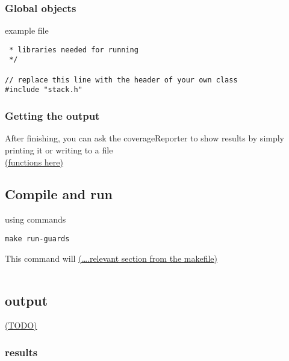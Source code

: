 \documentclass{elteikthesis}[2018/06/06]
\begin{document}
\subsubsection{Global objects}
\label{sec-2-4-2-1}
\begin{listing}
\caption{example file}
\begin{verbatim}
 * libraries needed for running
 */

// replace this line with the header of your own class
#include "stack.h"
\end{verbatim}
\end{listing}

\subsubsection{Getting the output}
\label{sec-2-4-2-2}
After finishing, you can ask the coverageReporter to show results by simply printing it or writing to a file \\
\uline{(functions here)} \\
\subsection{Compile and run}
\label{sec-2-4-3}
using commands \\
\begin{verbatim}
make run-guards
\end{verbatim}
This command will \uline{(\ldots{}.relevant section from the makefile)} \\
\begin{center}
\begin{tabular}{}
\\
\\
\end{tabular}
\end{center}
\subsection{output}
\label{sec-2-4-4}
\uline{(TODO)} \\
\subsubsection{results}
\label{sec-2-4-4-1}
\begin{center}
\begin{tabular}{}
\\
\\
\\
\end{tabular}
\end{center}
\end{document}
